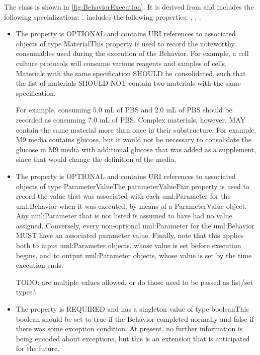 %
The  class is shown in \ref{fig:BehaviorExecution}. It is derived from  and includes the following specializations: . %
 includes the following properties: , , . %
\begin{itemize}%
\item%
The  property is OPTIONAL and contains URI references to associated objects of type MaterialThis property is used to record the noteworthy consumables used during the execution of the
        Behavior. For example, a cell culture protocols will consume various reagents and samples of cells. Materials
        with the same specification SHOULD be consolidated, such that the list of materials SHOULD NOT contain two
        materials with the same specification.

        For example, consuming 5.0 mL of PBS and 2.0 mL of PBS should be recorded as consuming 7.0 mL of PBS.
        Complex materials, however, MAY contain the same material more than once in their substructure.
        For example, M9 media contains glucose, but it would not be necessary to consolidate the glucose in M9 media
        with additional glucose that was added as a supplement, since that would change the definition of the media.%
\item%
The  property is OPTIONAL and contains URI references to associated objects of type ParameterValueThe parameterValuePair property is used to record the value that was associated with each
        uml:Parameter for the uml:Behavior when it was executed, by means of a ParameterValue object.
        Any uml:Parameter that is not listed is assumed to have had no value assigned. Conversely, every non-optional
        uml:Parameter for the uml:Behavior MUST have an associated parameter value.
        Finally, note that this applies both to input uml:Parameter objects, whose value is set before execution begins,
        and to output uml:Parameter objects, whose value is set by the time execution ends.

        TODO: are multiple values allowed, or do those need to be passed as list/set types?
\item%
The  property is REQUIRED and has a singleton value of type booleanThis boolean should be set to true if the Behavior completed normally and false if there
        was some exception condition. At present, no further information is being encoded about exceptions, but this
        is an extension that is anticipated for the future.%
\end{itemize}%
